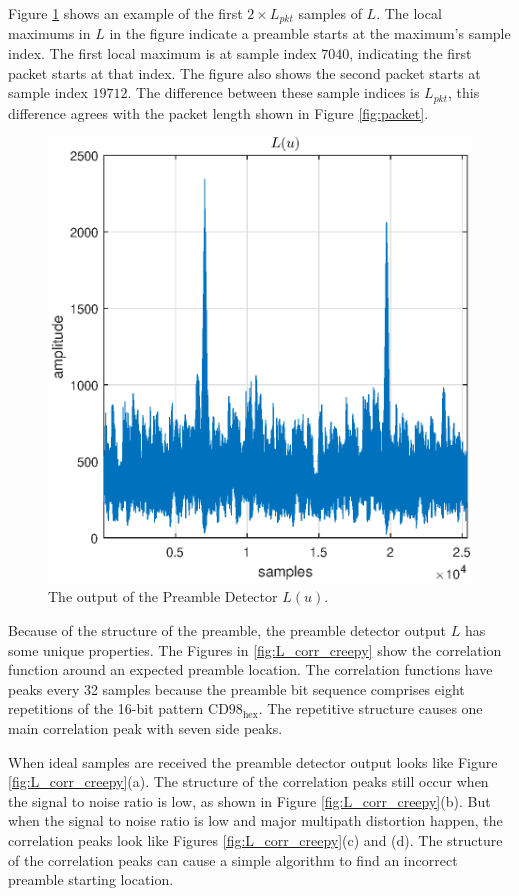 Figure \ref{fig:L_2_packets} shows an example of the first $2\times L_{pkt} $ samples of $L$.
The local maximums in $L$ in the figure indicate a preamble starts at the maximum's sample index.
The first local maximum is at sample index $7040$, indicating the first packet starts at that index.
The figure also shows the second packet starts at sample index $19712$.
The difference between these sample indices is $ L_{pkt} $, this difference agrees with the packet length shown in Figure \ref{fig:packet}.
\begin{figure}
	\centering\includegraphics[width=5in]{figures/gpu/L_2_packets.eps}
	\caption{The output of the Preamble Detector $L(u)$.}
	\label{fig:L_2_packets}
\end{figure}

Because of the structure of the preamble, the preamble detector output $L$ has some unique properties.
The Figures in \ref{fig:L_corr_creepy} show the correlation function around an expected preamble location.
The correlation functions have peaks every 32 samples because the preamble bit sequence comprises eight repetitions of the 16-bit pattern $\text{CD98}_\text{hex}$.
The repetitive structure causes one main correlation peak with seven side peaks.

When ideal samples are received the preamble detector output looks like Figure \ref{fig:L_corr_creepy}(a).
The structure of the correlation peaks still occur when the signal to noise ratio is low, as shown in Figure \ref{fig:L_corr_creepy}(b).
But when the signal to noise ratio is low and major multipath distortion happen, the correlation peaks look like Figures \ref{fig:L_corr_creepy}(c) and (d).
The structure of the correlation peaks can cause a simple algorithm to find an incorrect preamble starting location.

